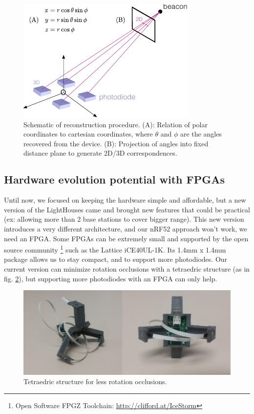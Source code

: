\documentclass[sigchi]{acmart}
\begin{document}
\begin{figure}[h]
\centering
\includegraphics[width=1.0\columnwidth]{Figures/reconstruction.pdf}
\caption{Schematic of reconstruction procedure. (A): Relation of polar coordinates to cartesian coordinates, where $\theta$ and $\phi$ are the angles recovered from the device. (B): Projection of angles into fixed distance plane to generate 2D/3D correspondences.}
\label{Fig:Reconstruction}
\end{figure}


\subsection{Hardware evolution potential with FPGAs}

Until now, we focused on keeping the hardware simple and affordable, but a new version of the LightHouses came and
brought new features that could be practical (ex: allowing more than 2 base stations to cover bigger range).
This new version introduces a very different architecture, and our nRF52 approach won't work, we need an FPGA.
Some FPGAs can be extremely small and supported by the open source community \footnote{ Open Software FPGZ Toolchain: \url{http://clifford.at/IceStorm} } such as the Lattice iCE40UL-1K. Its 1.4mm x 1.4mm package allows us to stay 
compact, and to support more photodiodes.
Our current version can minimize rotation occlusions with a tetraedric structure (as in fig. \ref{Fig:tetraedric_structure}), but supporting more photodiodes with an FPGA can only help.

\begin{figure}[h]
  \centering
  \includegraphics[width=\linewidth]{Figures/tetraedric_structure.jpg}
  \caption{Tetraedric structure for less rotation occlusions.}
  \label{Fig:tetraedric_structure}
\end{figure}
\end{document}
